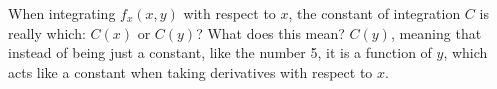 {When integrating $f_x(x,y)$ with respect to $x$, the constant of integration $C$ is really which: $C(x)$ or $C(y)$? What does this mean?}
{$C(y)$, meaning that instead of being just a constant, like the number 5, it is a function of $y$, which acts like a constant when taking derivatives with respect to $x$.
}
